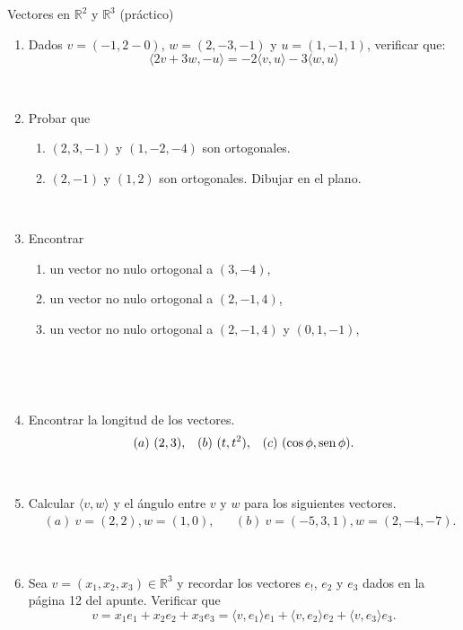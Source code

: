 \begin{chapter}{Vectores en $\mathbb R^2$ y $\mathbb R^3$ (práctico)}
\begin{enumerate}
\

\item Dados $v = (-1, 2-0)$, $w = (2,-3,-1)$  y $u = (1,-1,1)$, verificar que:
\begin{equation*}
	\langle 2v + 3w , -u   \rangle = -2\langle v ,u \rangle -3 \langle w , u  \rangle
\end{equation*}

\ 

\item Probar  que 
\begin{enumerate}
	\item $(2,3,-1)$ y $(1, -2, -4)$ son ortogonales.
	\item $(2,-1)$ y $(1,2)$ son ortogonales. Dibujar en el plano. 
\end{enumerate}
\ 

\item Encontrar 
\begin{enumerate}
	\item un vector no nulo ortogonal  a $(3,-4)$,
	\item un vector no nulo ortogonal a $(2,-1,4)$,
	\item un vector no nulo ortogonal a $(2,-1,4)$ y $(0,1,-1)$,
\end{enumerate}

\



\ 
\item Encontrar la longitud de los vectores.
\begin{align*}
&(a) \ (2,3), && (b) \ (t,t^2), & (c) \ (\cos\phi,\sen\phi).
\end{align*}

\

\item Calcular $\langle v , w  \rangle$ y el {\'a}ngulo entre $v$ y $w$  para los siguientes vectores.
\begin{align*}
&(a) \ v=(2,2), w=(1,0), &&  (b) \  v=(-5,3,1), w=(2,-4,-7).
\end{align*}

\

\item Sea $v=(x_1,x_2,x_3)\in\mathbb{R}^3$ y recordar los vectores $e_!$, $e_2$ y $e_3$ dados en la p\'agina 12 del apunte. Verificar que 
$$v=x_1e_1+x_2e_2+x_3e_3=\langle v,e_1\rangle e_1+\langle v,e_2\rangle e_2+\langle v,e_3\rangle e_3.$$

\


\end{enumerate}
\end{chapter}

